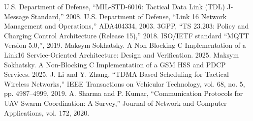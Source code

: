 \documentclass{article}
\begin{document}
\begin{thebibliography}{10}
 U.S. Department of Defense, ``MIL-STD-6016: Tactical Data Link (TDL) J-Message Standard,'' 2008.
 U.S. Department of Defense, ``Link 16 Network Management and Operations,'' ADA404334, 2003.
 3GPP, ``TS 23.203: Policy and Charging Control Architecture (Release 15),'' 2018.
 ISO/IETF standard ``MQTT Version 5.0,'', 2019.
 Maksym Sokhatsky. A Non-Blocking C Implementation of a Link16 Service-Oriented Architecture: Design and Verification. 2025.
 Maksym Sokhatsky. A Non-Blocking C Implementation of a GSM HSS and PDCP Services. 2025.
 J. Li and Y. Zhang, ``TDMA-Based Scheduling for Tactical Wireless Networks,'' IEEE Transactions on Vehicular Technology, vol. 68, no. 5, pp. 4987--4999, 2019.
 A. Sharma and P. Kumar, ``Communication Protocols for UAV Swarm Coordination: A Survey,'' Journal of Network and Computer Applications, vol. 172, 2020.



\end{thebibliography}
\end{document}
